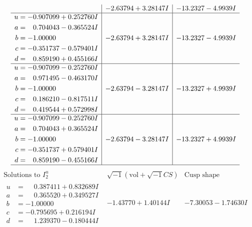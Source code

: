 \documentclass[1p]{elsarticle_modified}
\theoremstyle{definition}
\newcommand{\I}{\sqrt{-1}}
\begin{document}
$$\begin{array}{c|c|c}
 & -2.63794 + 3.28147 I & -13.2327 - 4.9939 I \\ \hline\begin{aligned}
u &= -0.907099 + 0.252760 I \\
a &= \phantom{-}0.704043 - 0.365524 I \\
b &= -1.00000\phantom{ +0.000000I} \\
c &= -0.351737 - 0.579401 I \\
d &= \phantom{-}0.859190 + 0.455166 I\end{aligned}
 & -2.63794 + 3.28147 I & -13.2327 - 4.9939 I \\ \hline\begin{aligned}
u &= -0.907099 - 0.252760 I \\
a &= \phantom{-}0.971495 - 0.463170 I \\
b &= -1.00000\phantom{ +0.000000I} \\
c &= \phantom{-}0.186210 - 0.817511 I \\
d &= \phantom{-}0.419544 + 0.572998 I\end{aligned}
 & -2.63794 - 3.28147 I & -13.2327 + 4.9939 I \\ \hline\begin{aligned}
u &= -0.907099 - 0.252760 I \\
a &= \phantom{-}0.704043 + 0.365524 I \\
b &= -1.00000\phantom{ +0.000000I} \\
c &= -0.351737 + 0.579401 I \\
d &= \phantom{-}0.859190 - 0.455166 I\end{aligned}
 & -2.63794 - 3.28147 I & -13.2327 + 4.9939 I\\
 \hline 
 \end{array}$$\newpage$$\begin{array}{c|c|c}  
\text{Solutions to }I^u_{2}& \I (\text{vol} + \sqrt{-1}CS) & \text{Cusp shape}\\
 \hline 
\begin{aligned}
u &= \phantom{-}0.387411 + 0.832689 I \\
a &= \phantom{-}0.365520 + 0.349527 I \\
b &= -1.00000\phantom{ +0.000000I} \\
c &= -0.795695 + 0.216194 I \\
d &= \phantom{-}1.239370 - 0.180444 I\end{aligned}
 & -1.43770 + 1.40144 I & -7.30053 - 1.74630 I \\ \hline\begin{aligned}

\end{aligned}
\end{array}$$
\end{document}
